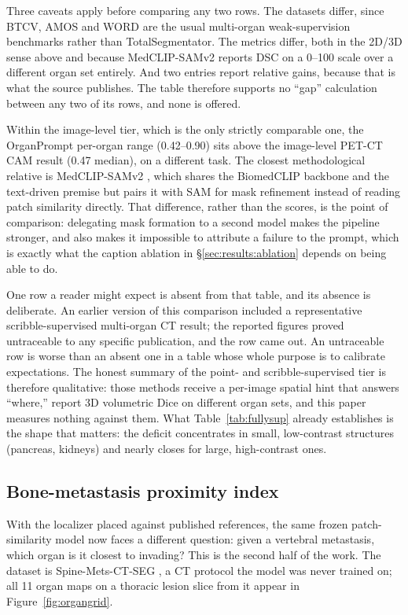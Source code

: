 Three caveats apply before comparing any two rows. The datasets differ, since
BTCV, AMOS and WORD are the usual multi-organ weak-supervision benchmarks rather
than TotalSegmentator. The metrics differ, both in the 2D/3D sense above and
because MedCLIP-SAMv2 reports DSC on a 0--100 scale over a different organ set
entirely. And two entries report relative gains, because that is what the source
publishes. The table therefore supports no ``gap'' calculation between any two
of its rows, and none is offered.

Within the image-level tier, which is the only strictly comparable one, the
OrganPrompt per-organ range (0.42--0.90) sits above the image-level PET-CT CAM
result (0.47 median), on a different task. The closest methodological relative
is MedCLIP-SAMv2 \cite{koleilat2025medclipsamv2}, which shares the BiomedCLIP
backbone and the text-driven premise but pairs it with SAM
\cite{kirillov2023sam} for mask refinement instead of reading patch similarity
directly. That difference, rather than the scores, is the point of comparison:
delegating mask formation to a second model makes the pipeline stronger, and
also makes it impossible to attribute a failure to the prompt, which is exactly
what the caption ablation in \S\ref{sec:results:ablation} depends on being able
to do.

One row a reader might expect is absent from that table, and its absence is
deliberate. An earlier version of this comparison included a representative
scribble-supervised multi-organ CT result; the reported figures proved
untraceable to any specific publication, and the row came out. An untraceable
row is worse than an absent one in a table whose whole purpose is to calibrate
expectations. The honest summary of the point- and scribble-supervised tier is
therefore qualitative: those methods receive a per-image spatial hint that
answers ``where,'' report 3D volumetric Dice on different organ sets, and this
paper measures nothing against them. What Table~\ref{tab:fullysup} already
establishes is the shape that matters: the deficit concentrates in small,
low-contrast structures (pancreas, kidneys) and nearly closes for large,
high-contrast ones.

\subsection{Bone-metastasis proximity index}
\label{sec:results:index}

With the localizer placed against published references, the same frozen
patch-similarity model now faces a different question: given a vertebral
metastasis, which organ is it closest to invading? This is the second half of
the work. The dataset is Spine-Mets-CT-SEG \cite{pieper2024spinemets}, a CT
protocol the model was never trained on; all 11 organ maps on a thoracic lesion
slice from it appear in Figure~\ref{fig:organgrid}.

